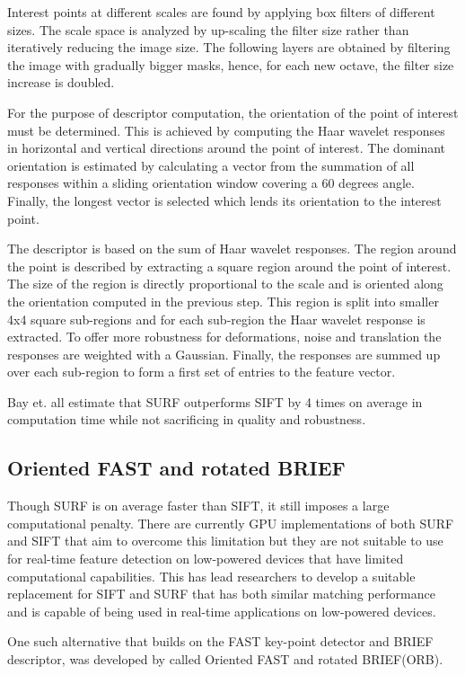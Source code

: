 \documentclass{l4proj}
\begin{document}
Interest points at different scales are found by applying box filters of different sizes. The scale space is analyzed by up-scaling the filter size rather than iteratively reducing the image size. The following layers are obtained by filtering the image with gradually bigger masks, hence, for each new octave, the filter size increase is doubled. 

For the purpose of descriptor computation, the orientation of the point of interest must be determined. This is achieved by computing the Haar wavelet responses in horizontal and vertical directions around the point of interest. The dominant orientation is estimated by calculating a vector from the summation of all responses within a sliding orientation window covering a 60 degrees angle. Finally, the longest vector is selected which lends its orientation to the interest point. 

The descriptor is based on the sum of Haar wavelet responses. The region around the point is described by extracting a square region around the point of interest. The size of the region is directly proportional to the scale and is oriented along the orientation computed in the previous step. This region is split into smaller 4x4 square sub-regions and for each sub-region the Haar wavelet response is extracted. To offer more robustness for deformations, noise and translation the responses are weighted with a Gaussian. Finally, the responses are summed up over each sub-region to form a first set of entries to the feature vector. 

Bay et. all estimate that SURF outperforms SIFT by 4 times on average in computation time while not sacrificing in quality and robustness.


\subsection{Oriented FAST and rotated BRIEF}

Though SURF is on average faster than SIFT, it still imposes a large computational penalty. There are currently GPU implementations of both SURF and SIFT that aim to overcome this limitation but they are not suitable to use for real-time feature detection on low-powered devices that have limited computational capabilities. This has lead researchers to develop a suitable replacement for SIFT and SURF that has both similar matching performance and is capable of being used in real-time applications on low-powered devices. 

One such alternative that builds on the FAST key-point detector and BRIEF descriptor, was developed by \citet{Rublee:2011:OEA:2355573.2356268} called Oriented FAST and rotated BRIEF(ORB).
\end{document}
